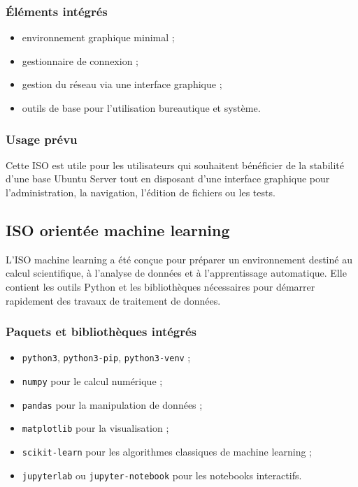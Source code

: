 \documentclass[12pt,a4paper]{article}
\begin{document}
\subsubsection*{Éléments intégrés}

\begin{itemize}[label=--]
    \item environnement graphique minimal ;
    \item gestionnaire de connexion ;
    \item gestion du réseau via une interface graphique ;
    \item outils de base pour l'utilisation bureautique et système.
\end{itemize}

\subsubsection*{Usage prévu}

Cette ISO est utile pour les utilisateurs qui souhaitent bénéficier de la stabilité d'une base Ubuntu Server tout en disposant d'une interface graphique pour l'administration, la navigation, l'édition de fichiers ou les tests.

\subsection{ISO orientée machine learning}

L'ISO machine learning a été conçue pour préparer un environnement destiné au calcul scientifique, à l'analyse de données et à l'apprentissage automatique. Elle contient les outils Python et les bibliothèques nécessaires pour démarrer rapidement des travaux de traitement de données.

\subsubsection*{Paquets et bibliothèques intégrés}

\begin{itemize}[label=--]
    \item \texttt{python3}, \texttt{python3-pip}, \texttt{python3-venv} ;
    \item \texttt{numpy} pour le calcul numérique ;
    \item \texttt{pandas} pour la manipulation de données ;
    \item \texttt{matplotlib} pour la visualisation ;
    \item \texttt{scikit-learn} pour les algorithmes classiques de machine learning ;
    \item \texttt{jupyterlab} ou \texttt{jupyter-notebook} pour les notebooks interactifs.
\end{itemize}
\end{document}
